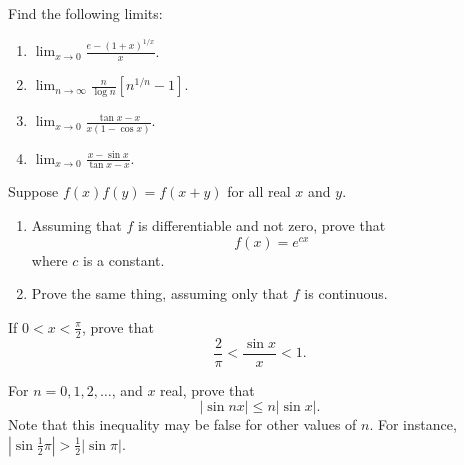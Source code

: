   \begin{exercise}[Rudin 8.5]
    Find the following limits:
    \begin{enumerate}
      \item $\lim_{x \to 0} \frac{e - (1+x)^{1/x}}{x}$.
      \item $\lim_{n \to \infty} \frac{n}{\log n} [n^{1/n} - 1]$.
      \item $\lim_{x \to 0} \frac{\tan x - x}{x(1 - \cos x)}$.
      \item $\lim_{x \to 0} \frac{x - \sin x}{\tan x - x}$.
    \end{enumerate}
  \end{exercise}
  \begin{solution}

  \end{solution}

  \begin{exercise}[Rudin 8.6]
    Suppose $f(x)f(y) = f(x+y)$ for all real $x$ and $y$.
    \begin{enumerate}
      \item Assuming that $f$ is differentiable and not zero, prove that
        \begin{equation}
          f(x) = e^{cx}
        \end{equation}
        where $c$ is a constant.
      \item Prove the same thing, assuming only that $f$ is continuous.
    \end{enumerate}
  \end{exercise}
  \begin{solution}

  \end{solution}

  \begin{exercise}[Rudin 8.7]
    If $0 < x < \frac{\pi}{2}$, prove that
    \begin{equation}
      \frac{2}{\pi} < \frac{\sin x}{x} < 1.
    \end{equation}
  \end{exercise}
  \begin{solution}

  \end{solution}

  \begin{exercise}[Rudin 8.8]
    For $n = 0, 1, 2, \dots$, and $x$ real, prove that
    \begin{equation}
      |\sin nx| \leq n |\sin x|.
    \end{equation}
    Note that this inequality may be false for other values of $n$. For instance, $|\sin \frac{1}{2}\pi| > \frac{1}{2} |\sin \pi|$.
  \end{exercise}
  \begin{solution}

  \end{solution}

